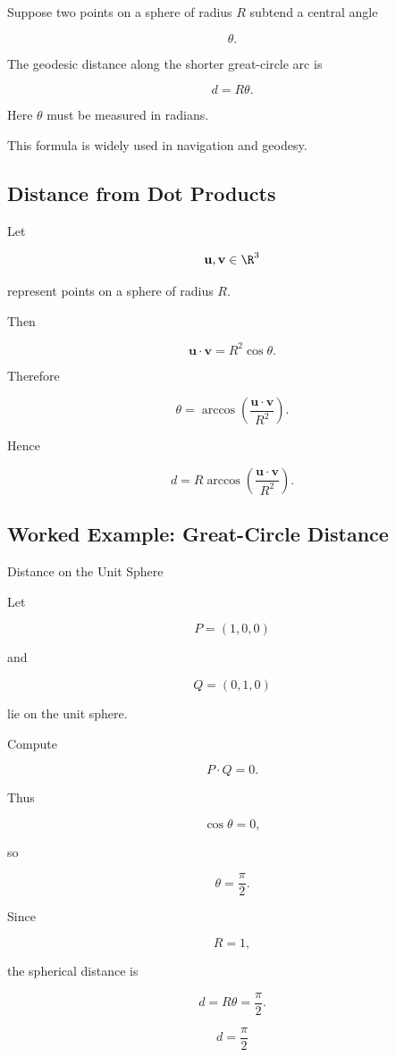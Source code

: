 Suppose two points on a sphere of radius \(R\) subtend a central angle

\[
\theta.
\]

The geodesic distance along the shorter great-circle arc is

\[
\boxed{
d=R\theta.
}
\]

Here \(\theta\) must be measured in radians.

This formula is widely used in navigation and geodesy.

\subsection{Distance from Dot Products}
\label{subsec:spherical-distance-dot-product}

Let

\[
\mathbf{u},\mathbf{v}\in\R^3
\]

represent points on a sphere of radius \(R\).

Then

\[
\mathbf{u}\cdot\mathbf{v}
=
R^2\cos\theta.
\]

Therefore

\[
\boxed{
\theta
=
\arccos
\left(
\frac{\mathbf{u}\cdot\mathbf{v}}{R^2}
\right).
}
\]

Hence

\[
\boxed{
d
=
R\arccos
\left(
\frac{\mathbf{u}\cdot\mathbf{v}}{R^2}
\right).
}
\]

\subsection{Worked Example: Great-Circle Distance}
\label{subsec:worked-great-circle-distance}

\begin{workedexamplebox}{Distance on the Unit Sphere}

Let

\[
P=(1,0,0)
\]

and

\[
Q=(0,1,0)
\]

lie on the unit sphere.

Compute

\[
P\cdot Q=0.
\]

Thus

\[
\cos\theta=0,
\]

so

\[
\theta=\frac{\pi}{2}.
\]

Since

\[
R=1,
\]

the spherical distance is

\[
d=R\theta=\frac{\pi}{2}.
\]

\begin{answerbox}
\[
\boxed{d=\frac{\pi}{2}}
\]
\end{answerbox}
\end{workedexamplebox}

